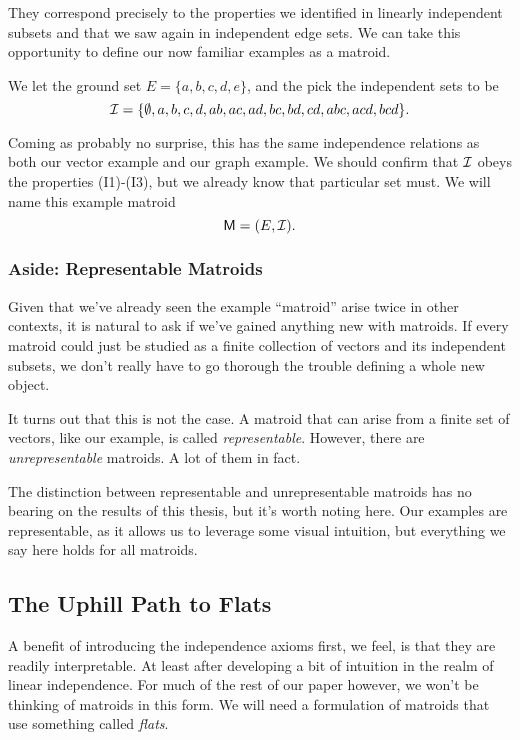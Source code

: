 \documentclass[12pt,oneside]{../../sfsuthesis}
\begin{document}
They correspond precisely to the properties we identified in linearly independent subsets and that we saw again in independent edge sets.
We can take this opportunity to define our now familiar examples as a matroid.
\begin{example}

    We let the ground set \( E = \{ a, b, c, d, e \} \), and the pick the independent sets to be
    \[
        \mathcal{I} = \{
        \emptyset,
        a, b, c, d,
        ab, ac, ad, bc, bd, cd,
        abc, acd, bcd
        \}.
    \]

    Coming as probably no surprise, this has the same independence relations as both our vector example and our graph example.
    We should confirm that \( \mathcal{I} \) obeys the properties (I1)-(I3), but we already know that particular set must.
    We will name this example matroid
    \[
        \mathsf{M} = (E, \mathcal{I}).
    \]

\end{example}



\subsubsection{Aside: Representable Matroids}
Given that we've already seen the example ``matroid'' arise twice in other contexts, it is natural to ask if we've gained anything new with matroids.
If every matroid could just be studied as a finite collection of vectors and its independent subsets, we don't really have to go thorough the trouble defining a whole new object.

It turns out that this is not the case.
A matroid that can arise from a finite set of vectors, like our example, is called \emph{representable}.
However, there are \emph{unrepresentable} matroids.
A lot of them in fact.

The distinction between representable and unrepresentable matroids has no bearing on the results of this thesis, but it's worth noting here.
Our examples are representable, as it allows us to leverage some visual intuition, but everything we say here holds for all matroids.

\subsection{The Uphill Path to Flats}

A benefit of introducing the independence axioms first, we feel, is that they are readily interpretable.
At least after developing a bit of intuition in the realm of linear independence.
For much of the rest of our paper however, we won't be thinking of matroids in this form.
We will need a formulation of matroids that use something called \emph{flats}.
\end{document}
